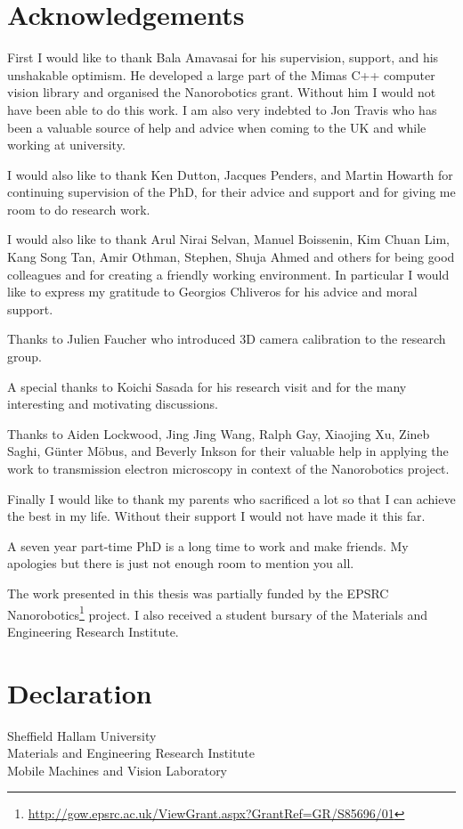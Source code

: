 \documentclass[12pt,a4paper,oneside,openright]{book}
\newcommand{\shu}{Sheffield Hallam University}
\newcommand{\meri}{Materials and Engineering Research Institute}
\newcommand{\mmvl}{Mobile Machines and Vision Laboratory}
\begin{document}
\begin{CJK}{UTF8}{}

\chapter*{Acknowledgements}%
First I would like to thank Bala Amavasai for his supervision, support, and his unshakable optimism. He developed a large part of the Mimas C++ computer vision library and organised the Nanorobotics grant. Without him I would not have been able to do this work. I am also very indebted to Jon Travis who has been a valuable source of help and advice when coming to the UK and while working at university.

I would also like to thank Ken Dutton, Jacques Penders, and Martin Howarth for continuing supervision of the PhD, for their advice and support and for giving me room to do research work.

I would also like to thank Arul Nirai Selvan, Manuel Boissenin, Kim Chuan Lim, Kang Song Tan, Amir Othman, Stephen, Shuja Ahmed and others for being good colleagues and for creating a friendly working environment. In particular I would like to express my gratitude to Georgios Chliveros for his advice and moral support.

Thanks to Julien Faucher who introduced 3D camera calibration to the research group.

A special thanks to Koichi Sasada for his research visit and for the many interesting and motivating discussions.

Thanks to Aiden Lockwood, Jing Jing Wang, Ralph Gay, Xiaojing Xu, Zineb Saghi, Günter Möbus, and Beverly Inkson for their valuable help in applying the work to transmission electron microscopy in context of the Nanorobotics project.

Finally I would like to thank my parents who sacrificed a lot so that I can achieve the best in my life. Without their support I would not have made it this far.

A seven year part-time PhD is a long time to work and make friends. My apologies but there is just not enough room to mention you all.

The work presented in this thesis was partially funded by the EPSRC Nanorobotics\footnote{\url{http://gow.epsrc.ac.uk/ViewGrant.aspx?GrantRef=GR/S85696/01}} project. I also received a student bursary of the Materials and Engineering Research Institute.

\chapter*{Declaration}
\begin{center}
  \begin{large}
    \begin{textrm}
      \shu\\
      \meri\\
      \mmvl\\
    \end{textrm}
  \end{large}
\end{center}\bigskip


\end{CJK}
\end{document}

